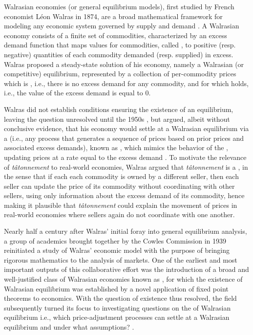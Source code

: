 Walrasian economies (or general equilibrium models), first studied by French economist L\'eon Walras in 1874, are a broad mathematical framework for modeling any economic system governed by supply and demand \cite{walras}. A Walrasian economy consists of a finite set of commodities, characterized by an excess demand function that maps values for commodities, called , to positive (resp. negative) quantities of each commodity demanded (resp. supplied) in excess. Walras proposed a steady-state solution of his economy, namely a Walrasian (or competitive) equilibrium, represented by a collection of per-commodity prices which is , i.e., there is no excess demand for any commodity, and for which  holds, i.e., the value of the excess demand is equal to 0. 

Walras did not establish conditions ensuring the existence of an equilibrium, leaving the question unresolved until the 1950s \cite{arrow-debreu}, but argued, albeit without conclusive evidence, that his economy would settle at a Walrasian equilibrium via a  (i.e., any process that generates a sequence of prices based on prior prices and associated excess demands), known as , which mimics the behavior of the , updating prices at a rate equal to the excess demand \cite{walras, uzawa1960walras, arrow-hurwicz}. To motivate the relevance of \emph{t\^atonnement} to real-world economies, Walras argued that \emph{t\^atonnement} is a , in the sense that if each each commodity is owned by a different seller, then each seller can update the price of its commodity without coordinating with other sellers, using only information about the excess demand of its commodity, hence making it plausible that \emph{t\^atonnement} could explain the movement of prices in real-world economies where sellers again do not coordinate with one another. 

Nearly half a century after Walras' initial foray into general equilibrium analysis, a group of academics brought together by the Cowles Commission in 1939 reinitiated a study of Walras' economic model with the purpose of bringing rigorous mathematics to the analysis of markets. One of the earliest and most important outputs of this collaborative effort was the introduction of a broad and well-justified class of Walrasian economies known as  \cite{arrow-debreu}, for which the existence of Walrasian equilibrium was established by a novel application of fixed point theorems to economics. With the question of existence thus resolved, the field subsequently turned its focus to investigating questions on the  of Walrasian equilibrium
i.e., which price-adjustment processes can settle at a Walrasian equilibrium and under what assumptions? \cite{uzawa1960walras,balasko1975some,arrow-hurwicz, cole2008fast, cheung2018dynamics,fisher-tatonnement, jain2005market, codenotti2005market, codenotti2006leontief, chen2009spending}.

